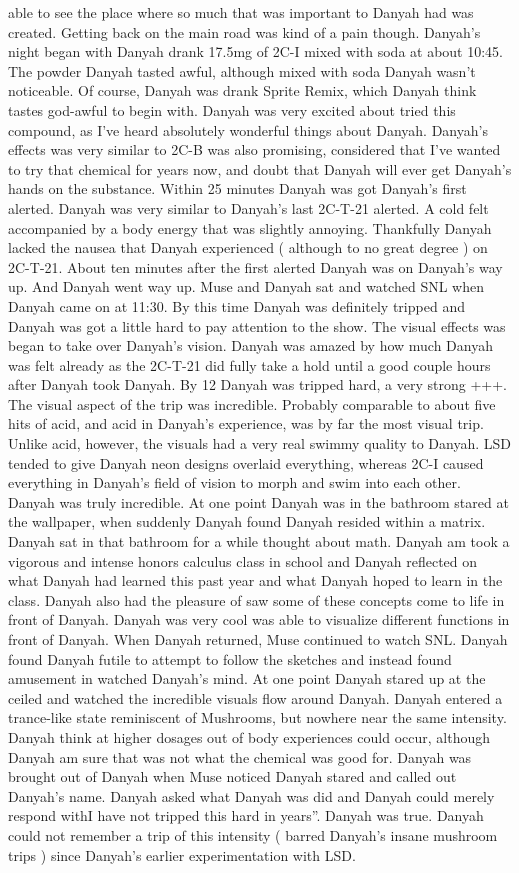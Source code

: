 \documentclass[12pt]{book}
\begin{document}
able to see the place where so much that was important to Danyah had was created. Getting back on the main road was kind of a pain though. Danyah's night began with Danyah drank 17.5mg of 2C-I mixed with soda at about 10:45. The powder Danyah tasted awful, although mixed with soda Danyah wasn't noticeable. Of course, Danyah was drank Sprite Remix, which Danyah think tastes god-awful to begin with. Danyah was very excited about tried this compound, as I've heard absolutely wonderful things about Danyah. Danyah's effects was very similar to 2C-B was also promising, considered that I've wanted to try that chemical for years now, and doubt that Danyah will ever get Danyah's hands on the substance. Within 25 minutes Danyah was got Danyah's first alerted. Danyah was very similar to Danyah's last 2C-T-21 alerted. A cold felt accompanied by a body energy that was slightly annoying. Thankfully Danyah lacked the nausea that Danyah experienced ( although to no great degree ) on 2C-T-21. About ten minutes after the first alerted Danyah was on Danyah's way up. And Danyah went way up. Muse and Danyah sat and watched SNL when Danyah came on at 11:30. By this time Danyah was definitely tripped and Danyah was got a little hard to pay attention to the show. The visual effects was began to take over Danyah's vision. Danyah was amazed by how much Danyah was felt already as the 2C-T-21 did fully take a hold until a good couple hours after Danyah took Danyah. By 12 Danyah was tripped hard, a very strong +++. The visual aspect of the trip was incredible. Probably comparable to about five hits of acid, and acid in Danyah's experience, was by far the most visual trip. Unlike acid, however, the visuals had a very real swimmy quality to Danyah. LSD tended to give Danyah neon designs overlaid everything, whereas 2C-I caused everything in Danyah's field of vision to morph and swim into each other. Danyah was truly incredible. At one point Danyah was in the bathroom stared at the wallpaper, when suddenly Danyah found Danyah resided within a matrix. Danyah sat in that bathroom for a while thought about math. Danyah am took a vigorous and intense honors calculus class in school and Danyah reflected on what Danyah had learned this past year and what Danyah hoped to learn in the class. Danyah also had the pleasure of saw some of these concepts come to life in front of Danyah. Danyah was very cool was able to visualize different functions in front of Danyah. When Danyah returned, Muse continued to watch SNL. Danyah found Danyah futile to attempt to follow the sketches and instead found amusement in watched Danyah's mind. At one point Danyah stared up at the ceiled and watched the incredible visuals flow around Danyah. Danyah entered a trance-like state reminiscent of Mushrooms, but nowhere near the same intensity. Danyah think at higher dosages out of body experiences could occur, although Danyah am sure that was not what the chemical was good for. Danyah was brought out of Danyah when Muse noticed Danyah stared and called out Danyah's name. Danyah asked what Danyah was did and Danyah could merely respond withI have not tripped this hard in years''. Danyah was true. Danyah could not remember a trip of this intensity ( barred Danyah's insane mushroom trips ) since Danyah's earlier experimentation with LSD. 
\end{document}
